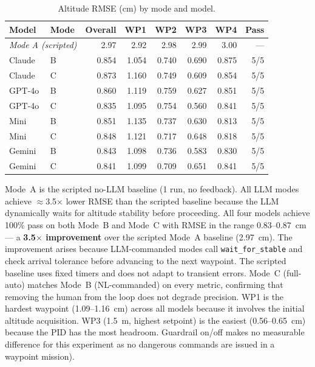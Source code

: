 \begin{table}[ht]
  \caption{Altitude RMSE (cm) by mode and model. }
  \label{tab:ch3_c8}
  \centering
  \small
  \begin{tabular}{llrrrrrr}
    \toprule
    Model & Mode & Overall & WP1 & WP2 & WP3 & WP4 & Pass \\
    \midrule
    \multicolumn{2}{l}{\textit{Mode A (scripted)}} & 2.97 & 2.92 & 2.98 & 2.99 & 3.00 & --- \\
    \midrule
    Claude  & B & 0.854 & 1.054 & 0.740 & 0.690 & 0.875 & 5/5 \\
    Claude  & C & 0.873 & 1.160 & 0.749 & 0.609 & 0.854 & 5/5 \\
    GPT-4o  & B & 0.860 & 1.119 & 0.759 & 0.627 & 0.851 & 5/5 \\
    GPT-4o  & C & 0.835 & 1.095 & 0.754 & 0.560 & 0.841 & 5/5 \\
    Mini    & B & 0.851 & 1.135 & 0.737 & 0.630 & 0.813 & 5/5 \\
    Mini    & C & 0.848 & 1.121 & 0.717 & 0.648 & 0.818 & 5/5 \\
    Gemini  & B & 0.843 & 1.098 & 0.736 & 0.583 & 0.830 & 5/5 \\
    Gemini  & C & 0.841 & 1.099 & 0.709 & 0.651 & 0.841 & 5/5 \\
    \bottomrule
  \end{tabular}
\end{table}
Mode~A is the scripted no-LLM baseline (1 run, no feedback). 
All LLM modes achieve $\approx$3.5$\times$ lower RMSE than the scripted baseline because the LLM dynamically waits for altitude stability before proceeding.
All four models achieve 100\% pass on both Mode~B and Mode~C with RMSE in the range 0.83--0.87~cm --- a \textbf{3.5$\times$ improvement} over the scripted Mode~A baseline (2.97~cm). 
The improvement arises because LLM-commanded modes call \texttt{wait\_for\_stable} and check arrival tolerance before advancing to the next waypoint.
The scripted baseline uses fixed timers and does not adapt to transient errors.
Mode~C (full-auto) matches Mode~B (NL-commanded) on every metric, confirming that removing the human from the loop does not degrade precision.
WP1 is the hardest waypoint (1.09--1.16~cm) across all
models because it involves the initial altitude acquisition.
WP3 (1.5~m, highest setpoint) is the easiest (0.56--0.65~cm) because the PID has the most headroom. Guardrail on/off makes no measurable difference for this experiment as no dangerous commands are issued in a waypoint mission).

